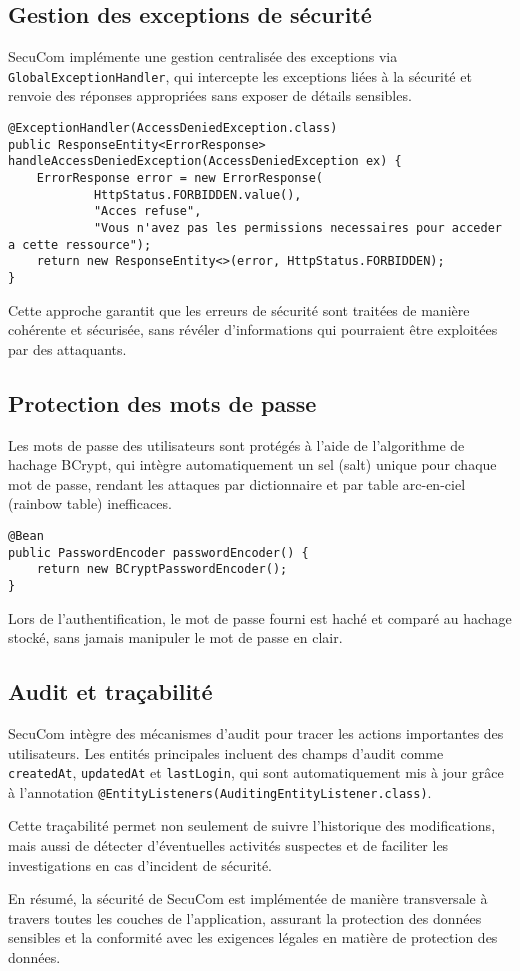 \subsection{Gestion des exceptions de sécurité}

SecuCom implémente une gestion centralisée des exceptions via \texttt{GlobalExceptionHandler}, qui intercepte les exceptions liées à la sécurité et renvoie des réponses appropriées sans exposer de détails sensibles.

\begin{lstlisting}
@ExceptionHandler(AccessDeniedException.class)
public ResponseEntity<ErrorResponse> handleAccessDeniedException(AccessDeniedException ex) {
    ErrorResponse error = new ErrorResponse(
            HttpStatus.FORBIDDEN.value(),
            "Acces refuse",
            "Vous n'avez pas les permissions necessaires pour acceder a cette ressource");
    return new ResponseEntity<>(error, HttpStatus.FORBIDDEN);
}
\end{lstlisting}

Cette approche garantit que les erreurs de sécurité sont traitées de manière cohérente et sécurisée, sans révéler d'informations qui pourraient être exploitées par des attaquants.

\subsection{Protection des mots de passe}

Les mots de passe des utilisateurs sont protégés à l'aide de l'algorithme de hachage BCrypt, qui intègre automatiquement un sel (salt) unique pour chaque mot de passe, rendant les attaques par dictionnaire et par table arc-en-ciel (rainbow table) inefficaces.

\begin{lstlisting}
@Bean
public PasswordEncoder passwordEncoder() {
    return new BCryptPasswordEncoder();
}
\end{lstlisting}

Lors de l'authentification, le mot de passe fourni est haché et comparé au hachage stocké, sans jamais manipuler le mot de passe en clair.

\subsection{Audit et traçabilité}

SecuCom intègre des mécanismes d'audit pour tracer les actions importantes des utilisateurs. Les entités principales incluent des champs d'audit comme \texttt{createdAt}, \texttt{updatedAt} et \texttt{lastLogin}, qui sont automatiquement mis à jour grâce à l'annotation \texttt{@EntityListeners(AuditingEntityListener.class)}.

Cette traçabilité permet non seulement de suivre l'historique des modifications, mais aussi de détecter d'éventuelles activités suspectes et de faciliter les investigations en cas d'incident de sécurité.

En résumé, la sécurité de SecuCom est implémentée de manière transversale à travers toutes les couches de l'application, assurant la protection des données sensibles et la conformité avec les exigences légales en matière de protection des données.
